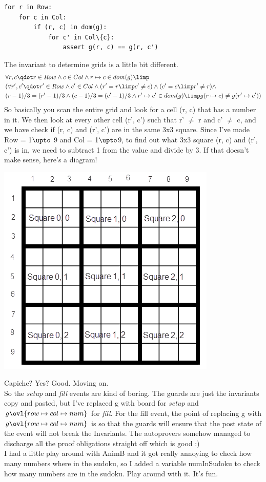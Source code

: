 \documentclass[a4paper]{article}
\begin{document}
\begin{verbatim}
for r in Row:
    for c in Col:
        if (r, c) in dom(g):
            for c' in Col\{c}:
                assert g(r, c) == g(r, c')
\end{verbatim}
The invariant to determine grids is a little bit different.
\begin{align*}
 &\forall  r, c \qdot  r \in  Row \land  c \in  Col \land  r \mapsto  c \in  dom(g) \limp  \\
&(\forall  r', c' \qdot  r' \in  Row \land  c' \in  Col \land  (r' = r \limp  c' \neq  c) \land  (c' = c \limp  r' \neq  r) \land \\
& (r- 1)/ 3 = (r'- 1)/ 3 \land  (c- 1)/ 3 = (c'- 1)/ 3 \land  r' \mapsto  c' \in  dom(g) \limp 
g(r \mapsto  c) \neq  g(r' \mapsto  c'))
\end{align*}
So basically you scan the entire grid and look for a cell (r, c) that has a number in it. We then look at every other cell (r', c') such that r' $\neq$ r and c' $\neq$ c, and we have check if (r, c) and (r', c') are in the same 3x3 square. Since I've made Row = 1$\upto$ 9 and Col = 1$\upto$9, to find out what 3x3 square (r, c) and (r', c') is in, we need to subtract 1 from the value and divide by 3. If that doesn't make sense, here's a diagram!
\centerline{\includegraphics{sudokuGrid.png}}
Capiche? Yes? Good. Moving on.\\
So the \textit{setup} and \textit{fill} events are kind of boring. The guards are just the invariants copy and pasted, but I've replaced g with board for \textit{setup} and $g \ovl  \{ row \mapsto  col \mapsto  num\}$ for \textit{fill}. For the fill event, the point of replacing g with $g \ovl  \{ row \mapsto  col \mapsto  num\}$ is so that the guards will ensure that the post state of the event will not break the Invariants. The autoprovers somehow managed to discharge all the proof obligations straight off which is good :)\\
I had a little play around with AnimB and it got really annoying to check how many numbers where in the sudoku, so I added a variable numInSudoku to check how many numbers are in the sudoku. Play around with it. It's fun.
\end{document}
